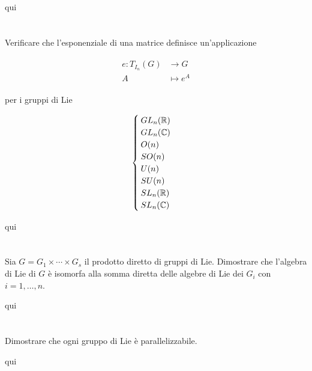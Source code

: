 qui

%

\newpage

%

\section{}\label{es3-10}

\begin{tcolorbox}
	Verificare che l'esponenziale di una matrice definisce un'applicazione
	
	\begin{align}
		\begin{split}
			e : T_{I_{n}}(G) &\to G\\
			A &\mapsto e^{A}
		\end{split}
	\end{align}
	
	per i gruppi di Lie
	
	\begin{equation}
		\begin{cases}
			GL_{n}(\mathbb{R})\\
			GL_{n}(\mathbb{C})\\
			O(n)\\
			SO(n)\\
			U(n)\\
			SU(n)\\
			SL_{n}(\mathbb{R})\\
			SL_{n}(\mathbb{C})
		\end{cases}
	\end{equation}
\end{tcolorbox}

qui

%

\newpage

%

\section{}\label{es3-11}

\begin{tcolorbox}
	Sia $ G = G_{1} \times \cdots \times G_{s} $ il prodotto diretto di gruppi di Lie. Dimostrare che l'algebra di Lie di $ G $ è isomorfa alla somma diretta delle algebre di Lie dei $ G_{i} $ con $ i=1,\dots,n $.
\end{tcolorbox}

qui

%

\newpage

%

\section{}\label{es3-12}

\begin{tcolorbox}
	Dimostrare che ogni gruppo di Lie è parallelizzabile.
\end{tcolorbox}

qui
